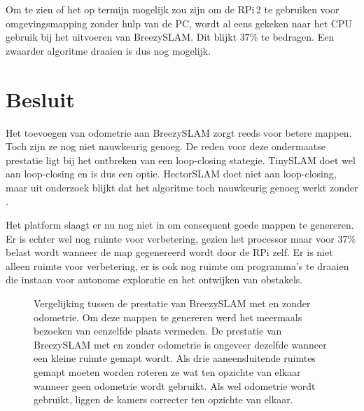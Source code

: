 \npar Om te zien of het op termijn mogelijk zou zijn om de RPi\,2 te gebruiken voor omgevingsmapping zonder hulp van de PC, wordt al eens gekeken naar het CPU gebruik bij het uitvoeren van BreezySLAM. Dit blijkt 37\% te bedragen. Een zwaarder algoritme draaien is dus nog mogelijk.

\section{Besluit}
Het toevoegen van odometrie aan BreezySLAM zorgt reeds voor betere mappen. Toch zijn ze nog niet nauwkeurig genoeg. De reden voor deze ondermaatse prestatie ligt bij het ontbreken van een loop-closing stategie. TinySLAM doet wel aan loop-closing en is dus een optie. HectorSLAM doet niet aan loop-closing, maar uit onderzoek blijkt dat het algoritme toch nauwkeurig genoeg werkt zonder \cite{paper:hectorSLAM}.

\npar Het platform slaagt er nu nog niet in om consequent goede mappen te genereren. Er is echter wel nog ruimte voor verbetering, gezien het processor maar voor 37\% belast wordt wanneer de map gegenereerd wordt door de RPi zelf. Er is niet alleen ruimte voor verbetering, er is ook nog ruimte om programma's te draaien die instaan voor autonome exploratie en het ontwijken van obstakels.

\begin{figure}
	\centering
	\hspace{0.01\linewidth}
	
	\hspace{0.01\linewidth}
	\caption{Vergelijking tussen de prestatie van BreezySLAM met en zonder odometrie. Om deze mappen te genereren werd het meermaals bezoeken van eenzelfde plaats vermeden. De prestatie van BreezySLAM met en zonder odometrie is ongeveer dezelfde wanneer een kleine ruimte gemapt wordt. Als drie aaneensluitende ruimtes gemapt moeten worden roteren ze wat ten opzichte van elkaar wanneer geen odometrie wordt gebruikt. Als wel odometrie wordt gebruikt, liggen de kamers correcter ten opzichte van elkaar.}\label{fig:BreezyRes}
\end{figure}

